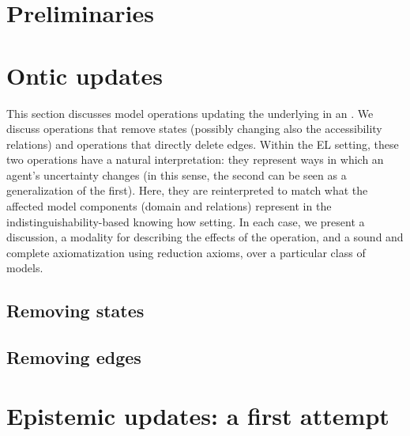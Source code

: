 \documentclass[sn-mathphys-num]{sn-jnl}%
\begin{document}
\section{Preliminaries}
\label{sec:basic}






\section{Ontic updates}
\label{sec:ontic}

This section discusses model operations updating the underlying \lts in an \ults. We discuss operations that remove states (possibly changing also the accessibility relations) and operations that directly delete edges. Within the EL setting, these two operations have a natural interpretation: they represent ways in which an agent's uncertainty changes (in this sense, the second can be seen as a generalization of the first). Here, they are reinterpreted to match what the affected model components (domain and relations) represent in the indistinguishability-based knowing how setting. In each case, we present a discussion, a modality for describing the effects of the operation, and a sound and complete axiomatization using reduction axioms, over a particular class of models.

\subsection{Removing states}
\label{sec:pal}


\subsection{Removing edges}
\label{sec:aul}


\section{Epistemic updates: a first attempt}
\label{sec:epistemic-basic} 
\end{document}
